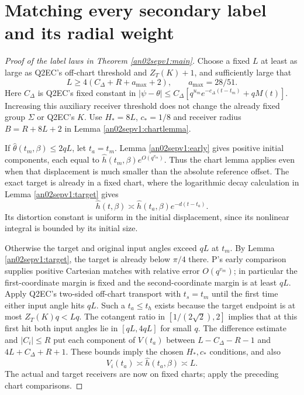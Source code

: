 \documentclass[11pt]{article}
\theoremstyle{remark}\newtheorem{remark}[theorem]{Remark}
\begin{document}
\section{Matching every secondary label and its radial weight}
\begin{proof}[Proof of the label laws in Theorem \ref{an02sepv1:main}]
Choose a fixed $L$ at least as large as Q2EC's off-chart
threshold and $Z_T(K)+1$, and sufficiently large that
\[
 L\ge4(C_\Delta+R+a_{\max}+2),\qquad a_{\max}=28/51.
\]
Here $C_\Delta$ is Q2EC's fixed constant in
$|\psi-\theta|\le C_\Delta[q^{u_m}e^{-c_\Delta(t-t_m)}+qM(t)]$.
Increasing this auxiliary receiver threshold does not change
the already fixed group $\Sigma$ or Q2EC's $K$.
Use $H_*=8L$, $c_*=1/8$ and receiver radius
$B=R+8L+2$ in Lemma \ref{an02sepv1:chartlemma}.

If $\widehat\theta(t_m,\beta)\le2qL$, let $t_a=t_m$.
Lemma \ref{an02sepv1:early} gives positive initial components,
each equal to $\widehat h(t_m,\beta)e^{O(q^{v_m})}$.
Thus the chart lemma applies even when that displacement is
much smaller than the absolute reference offset.
The exact target is already in a fixed chart, where the
logarithmic decay calculation in Lemma \ref{an02sepv1:target}
gives
\[
 \widehat h(t,\beta)\asymp
       \widehat h(t_a,\beta)e^{-d(t-t_a)}.
\]
Its distortion constant is uniform in the initial displacement,
since its nonlinear integral is bounded by its initial size.

Otherwise the target and original input angles exceed $qL$
at $t_m$. By Lemma \ref{an02sepv1:target}, the target is already
below $\pi/4$ there. P's early comparison supplies positive
Cartesian matches with relative error $O(q^{v_m})$; in
particular the first-coordinate margin is fixed and the
second-coordinate margin is at least $qL$.
Apply Q2EC's two-sided off-chart transport with $t_s=t_m$
until the first time either input angle hits $qL$.
Such a $t_a\le t_h$ exists because the target endpoint is at
most $Z_T(K)q<Lq$.
The cotangent ratio in $[1/(2\sqrt2),2]$ implies that at this
first hit both input angles lie in $[qL,4qL]$ for small $q$.
The difference estimate and $|C_i|\le R$ put each component
of $V(t_a)$ between $L-C_\Delta-R-1$ and
$4L+C_\Delta+R+1$. These bounds imply the chosen
$H_*,c_*$ conditions, and also
\[
 V_i(t_a)\asymp\widehat h(t_a,\beta)\asymp L.
\]
The actual and target receivers are now on fixed charts;
apply the preceding chart comparisons.


\end{proof}
\end{document}
